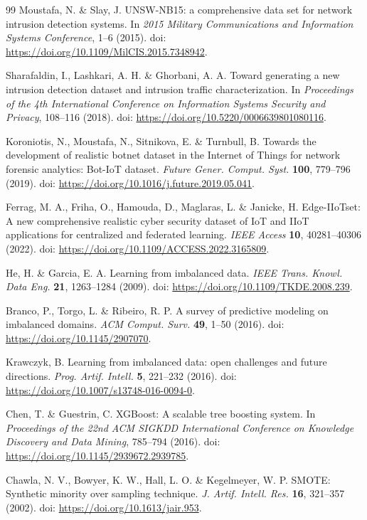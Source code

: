 \documentclass[fleqn,10pt]{wlscirep}
\begin{document}
\begin{thebibliography}{99}
Moustafa, N. \& Slay, J. UNSW-NB15: a comprehensive data set for network intrusion detection systems. In \emph{2015 Military Communications and Information Systems Conference}, 1--6 (2015). doi: \url{https://doi.org/10.1109/MilCIS.2015.7348942}.

Sharafaldin, I., Lashkari, A. H. \& Ghorbani, A. A. Toward generating a new intrusion detection dataset and intrusion traffic characterization. In \emph{Proceedings of the 4th International Conference on Information Systems Security and Privacy}, 108--116 (2018). doi: \url{https://doi.org/10.5220/0006639801080116}.

Koroniotis, N., Moustafa, N., Sitnikova, E. \& Turnbull, B. Towards the development of realistic botnet dataset in the Internet of Things for network forensic analytics: Bot-IoT dataset. \emph{Future Gener. Comput. Syst.} \textbf{100}, 779--796 (2019). doi: \url{https://doi.org/10.1016/j.future.2019.05.041}.

Ferrag, M. A., Friha, O., Hamouda, D., Maglaras, L. \& Janicke, H. Edge-IIoTset: A new comprehensive realistic cyber security dataset of IoT and IIoT applications for centralized and federated learning. \emph{IEEE Access} \textbf{10}, 40281--40306 (2022). doi: \url{https://doi.org/10.1109/ACCESS.2022.3165809}.

He, H. \& Garcia, E. A. Learning from imbalanced data. \emph{IEEE Trans. Knowl. Data Eng.} \textbf{21}, 1263--1284 (2009). doi: \url{https://doi.org/10.1109/TKDE.2008.239}.

Branco, P., Torgo, L. \& Ribeiro, R. P. A survey of predictive modeling on imbalanced domains. \emph{ACM Comput. Surv.} \textbf{49}, 1--50 (2016). doi: \url{https://doi.org/10.1145/2907070}.

Krawczyk, B. Learning from imbalanced data: open challenges and future directions. \emph{Prog. Artif. Intell.} \textbf{5}, 221--232 (2016). doi: \url{https://doi.org/10.1007/s13748-016-0094-0}.

Chen, T. \& Guestrin, C. XGBoost: A scalable tree boosting system. In \emph{Proceedings of the 22nd ACM SIGKDD International Conference on Knowledge Discovery and Data Mining}, 785--794 (2016). doi: \url{https://doi.org/10.1145/2939672.2939785}.

Chawla, N. V., Bowyer, K. W., Hall, L. O. \& Kegelmeyer, W. P. SMOTE: Synthetic minority over sampling technique. \emph{J. Artif. Intell. Res.} \textbf{16}, 321--357 (2002). doi: \url{https://doi.org/10.1613/jair.953}.


\end{thebibliography}
\end{document}
